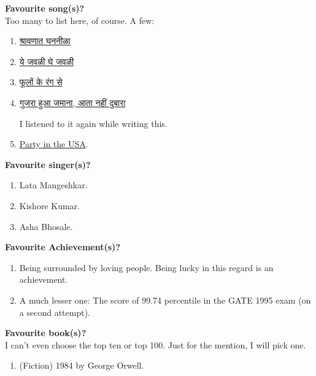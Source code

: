 \documentclass[17pt]{extarticle}  %
\begin{document}
\begin{enumerate}
\begin{english}
\item
\textbf{Favourite song(s)?}\\
Too many to list here, of course. A few:
\begin{enumerate}
\item \begin{marathi}\href{https://youtu.be/I9Ehun8Ahk4?si=mRLlBz0B9LF-880y}{श्रावणात घननीळा}\end{marathi}
\item\begin{marathi}\href{https://youtu.be/QjCdcO4t1qI?si=HYx-DluK-yfos_GU}{ये जवळी घे जवळी}\end{marathi}
\item \begin{marathi}\href{https://youtu.be/4CwFFWleNNA?si=ZL-2KpfQ4d7v4GRL}{फूलों के रंग से}\end{marathi}
\item \begin{marathi}\href{https://youtu.be/I2RefAyeVRA?si=RrVtDNg5ekkHvkSH}{गुजरा हुआ जमाना, आता नहीं दुबारा} \end{marathi} I listened to it again while writing this.
\item \href{https://youtu.be/M11SvDtPBhA?si=2zDFraxrFgbzlw7y}{Party in the USA}.
\end{enumerate}

\item \textbf{Favourite singer(s)?}\\
\begin{enumerate}
\item Lata Mangeshkar.
\item Kishore Kumar.
\item Asha Bhosale.
\end{enumerate}

\item \textbf{Favourite Achievement(s)?}\\
\begin{enumerate}
\item Being surrounded by loving people. Being lucky in this regard is an achievement.
\item A much lesser one: The score of 99.74 percentile in the GATE 1995 exam (on a second attempt).
\end{enumerate}
\item \textbf{Favourite book(s)?}\\
I can't even choose the top ten or top 100. Just for the mention, I will pick one.
\begin{enumerate}
\item (Fiction) 1984 by George Orwell.
\end{enumerate}


\end{english}
\end{enumerate}
\end{document}
